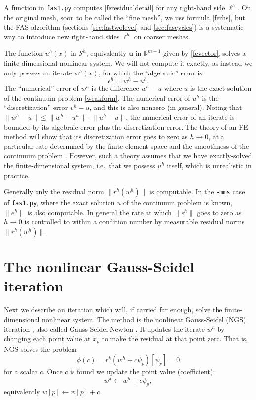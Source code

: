 \documentclass[letterpaper,final,12pt,reqno]{amsart}
\newcommand{\RR}{\mathbb{R}}
\newcommand{\bu}{\mathbf{u}}
\begin{document}
A function in \texttt{fas1.py} computes \eqref{feresidualdetail} for any right-hand side $\ell^h$.  On the original mesh, soon to be called the ``fine mesh'', we use formula \eqref{ferhs}, but the FAS algorithm (sections \ref{sec:fastwolevel} and \ref{sec:fascycles}) is a systematic way to introduce new right-hand sides $\ell^h$ on coarser meshes.

The function $u^h(x)$ in $\mathcal{S}^h$, equivalently $\bu$ in $\RR^{m-1}$ given by \eqref{fevector}, solves a finite-dimensional nonlinear system.  We will not compute it exactly, as instead we only possess an iterate $w^h(x)$, for which the ``algebraic'' error is
\begin{equation}
  e^h = w^h - u^h.  \label{feerror}
\end{equation}
The ``numerical'' error of $w^h$ is the difference $w^h-u$ where $u$ is the exact solution of the continuum problem \eqref{weakform}.  The numerical error of $u^h$ is the ``discretization'' error $u^h-u$, and this is also nonzero (in general).  Noting that $\|w^h-u\|\le \|w^h-u^h\|+\|u^h-u\|$, the numerical error of an iterate is bounded by its algebraic error plus the discretization error.  The theory of an FE method will show that its discretization error goes to zero as $h\to 0$, at a particular rate determined by the finite element space and the smoothness of the continuum problem \cite{Elmanetal2014}.  However, such a theory assumes that we have exactly-solved the finite-dimensional system, i.e.~that we possess $u^h$ itself, which is unrealistic in practice.

Generally only the residual norm $\|r^h(w^h)\|$ is computable.  In the \texttt{-mms} case of \texttt{fas1.py}, where the exact solution $u$ of the continuum problem is known, $\|e^h\|$ is also computable.  In general the rate at which $\|e^h\|$ goes to zero as $h\to 0$ is controlled to within a condition number \cite{Greenbaum1997} by measurable residual norms $\|r^h(w^h)\|$.


\section{The nonlinear Gauss-Seidel iteration}  \label{sec:ngs}

Next we describe an iteration which will, if carried far enough, solve the finite-dimensional nonlinear system.  The method is the nonlinear Gauss-Seidel (NGS) iteration \cite{Briggsetal2000}, also called Gauss-Seidel-Newton \cite{BrandtLivne2011}.  It updates the iterate $w^h$ by changing each point value at $x_p$ to make the residual at that point zero.  That is, NGS solves the problem
\begin{equation}
\phi(c) = r^h(w^h + c \psi_p)[\psi_p] = 0  \label{ngspointproblem}
\end{equation}
for a scalar $c$.  Once $c$ is found we update the point value (coefficient):
\begin{equation}
  w^h \leftarrow w^h + c \psi_p,  \label{ngspointupdate}
\end{equation}
equivalently $w[p] \leftarrow w[p] + c$.
\end{document}
